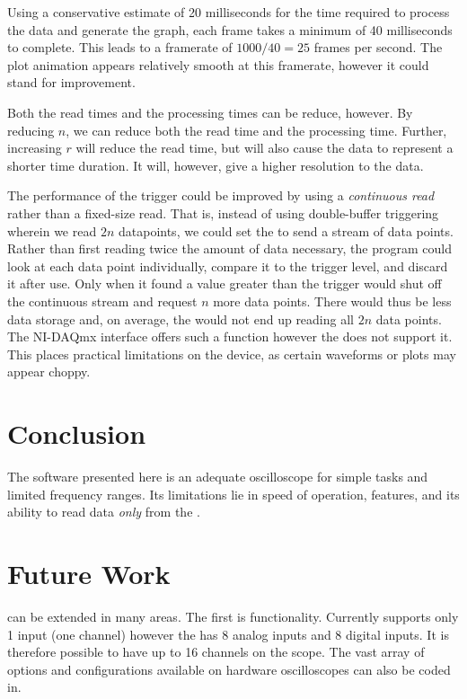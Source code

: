 \documentclass[12pt,reqno]{amsart}
\begin{document}
Using a conservative estimate of 20 milliseconds for the time required to process the data and generate the graph, each frame takes a minimum of 40 milliseconds to complete. This leads to a framerate of $1000 / 40 = 25$ frames per second. The plot animation appears relatively smooth at this framerate, however it could stand for improvement.

Both the read times and the processing times can be reduce, however. By reducing $n$, we can reduce both the read time and the processing time. Further, increasing $r$ will reduce the read time, but will also cause the data to represent a shorter time duration. It will, however, give a higher resolution to the data.

The performance of the trigger could be improved by using a \textit{continuous read} rather than a fixed-size read. That is, instead of using double-buffer triggering wherein we read $2n$ datapoints, we could set the \device{} to send a stream of data points. Rather than first reading twice the amount of data necessary, the program could look at each data point individually, compare it to the trigger level, and discard it after use. Only when it found a value greater than the trigger would \progname{} shut off the continuous stream and request $n$ more data points. There would thus be less data storage and, on average, the \device{} would not end up reading all $2n$ data points. The NI-DAQmx interface offers such a function however the \device{} does not support it. This places practical limitations on the device, as certain waveforms or plots may appear choppy.

\section{Conclusion}
The software presented here is an adequate oscilloscope for simple tasks and limited frequency ranges. Its limitations lie in speed of operation, features, and its ability to read data \textit{only} from the \device{}. 

\section{Future Work}
\progname{} can be extended in many areas. The first is functionality. Currently \progname{} supports only 1 input (one channel) however the \device{} has 8 analog inputs and 8 digital inputs. It is therefore possible to have up to 16 channels on the scope. The vast array of options and configurations available on hardware oscilloscopes can also be coded in.
\end{document}
